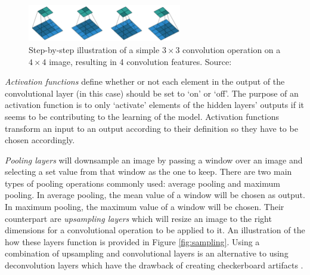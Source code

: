 \begin{figure}[h]
    \centering
    \includegraphics[width=0.6\textwidth]{dissertation/figures/convolution_operation.png}
    \caption{Step-by-step illustration of a simple $3\times3$ convolution operation on a $4\times4$ image, resulting in 4 convolution features. Source: \citet{dumoulin2016guide}}
    \label{fig:convolution}
\end{figure}

\textit{Activation functions} define whether or not each element in the output of the convolutional layer (in this case) should be set to `on' or `off'. The purpose of an activation function is to only `activate' elements of the hidden layers' outputs if it seems to be contributing to the learning of the model. Activation functions transform an input to an output according to their definition so they have to be chosen accordingly.

\textit{Pooling layers} will downsample an image by passing a window over an image and selecting a set value from that window as the one to keep. There are two main types of pooling operations commonly used: average pooling and maximum pooling. In average pooling, the mean value of a window will be chosen as output. In maximum pooling, the maximum value of a window will be chosen. Their counterpart are \textit{upsampling layers} which will resize an image to the right dimensions for a convolutional operation to be applied to it. An illustration of the how these layers function is provided in Figure \ref{fig:sampling}. Using a combination of upsampling and convolutional layers is an alternative to using deconvolution layers which have the drawback of creating checkerboard artifacts \citep{odena2016deconvolution}.

